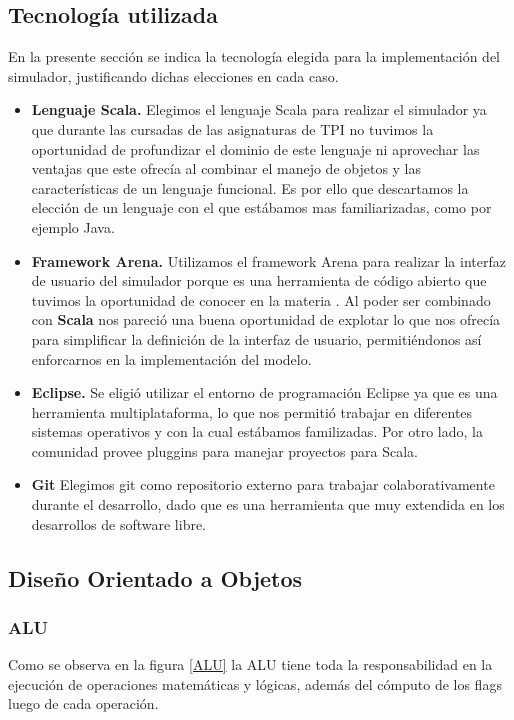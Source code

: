 \subsection{Tecnología utilizada}
En la presente sección se indica la tecnología elegida para la implementación del simulador, justificando dichas elecciones en cada caso.

\begin{itemize}


\item  \textbf{Lenguaje Scala.}
Elegimos el lenguaje Scala para realizar el simulador ya que durante las cursadas de las asignaturas de TPI no tuvimos la oportunidad de profundizar el dominio de este lenguaje ni aprovechar las ventajas que este ofrecía al combinar el manejo de objetos y las características de un lenguaje funcional. Es por ello que descartamos la elección de un lenguaje con el que estábamos mas familiarizadas, como por ejemplo Java.

\item  \textbf{Framework Arena.}
Utilizamos el framework Arena para realizar la interfaz de usuario del simulador porque es una herramienta de código abierto que tuvimos la oportunidad de conocer en la materia \ui. Al poder ser combinado con \textbf{Scala} nos pareció una buena oportunidad de explotar lo que nos ofrecía para simplificar la definición de la interfaz de usuario, permitiéndonos así enforcarnos en la implementación del modelo. 

\item  \textbf{Eclipse.}
Se eligió utilizar el entorno de programación Eclipse ya que es una herramienta multiplataforma, lo que nos permitió trabajar en diferentes sistemas operativos y con la cual estábamos familizadas.  Por otro lado, la comunidad provee pluggins para manejar proyectos para Scala.

\item  \textbf{Git}
Elegimos git como repositorio externo para trabajar colaborativamente durante el desarrollo, dado que es una herramienta que muy extendida en los desarrollos de software libre.

\end{itemize}

\subsection{Diseño Orientado a Objetos}

\subsubsection{ALU}
Como se observa en la figura \ref{ALU} la ALU tiene toda la responsabilidad en la ejecución de operaciones matemáticas y lógicas, además del cómputo de los flags luego de cada operación. 

